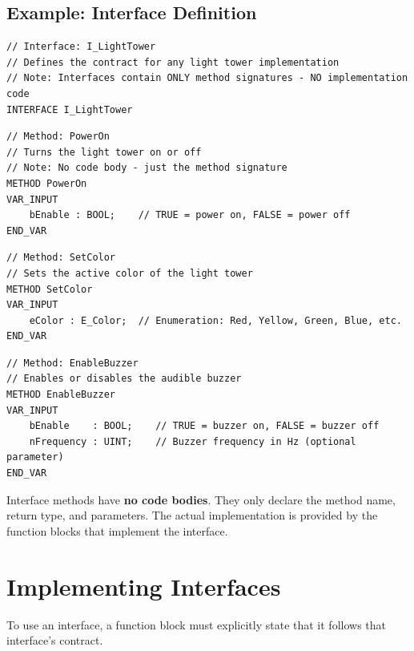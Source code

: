 \documentclass[11pt,a4paper]{article}
\begin{document}
\subsection*{Example: Interface Definition}

\begin{lstlisting}
// Interface: I_LightTower
// Defines the contract for any light tower implementation
// Note: Interfaces contain ONLY method signatures - NO implementation code
INTERFACE I_LightTower
\end{lstlisting}

\begin{lstlisting}
// Method: PowerOn
// Turns the light tower on or off
// Note: No code body - just the method signature
METHOD PowerOn
VAR_INPUT
    bEnable : BOOL;    // TRUE = power on, FALSE = power off
END_VAR
\end{lstlisting}

\begin{lstlisting}
// Method: SetColor
// Sets the active color of the light tower
METHOD SetColor
VAR_INPUT
    eColor : E_Color;  // Enumeration: Red, Yellow, Green, Blue, etc.
END_VAR
\end{lstlisting}

\begin{lstlisting}
// Method: EnableBuzzer
// Enables or disables the audible buzzer
METHOD EnableBuzzer
VAR_INPUT
    bEnable    : BOOL;    // TRUE = buzzer on, FALSE = buzzer off
    nFrequency : UINT;    // Buzzer frequency in Hz (optional parameter)
END_VAR
\end{lstlisting}

\begin{notebox}
Interface methods have \textbf{no code bodies}. They only declare the method name, return type, and parameters. The actual implementation is provided by the function blocks that implement the interface.
\end{notebox}

\section{Implementing Interfaces}

To use an interface, a function block must explicitly state that it follows that interface's contract.
\end{document}
